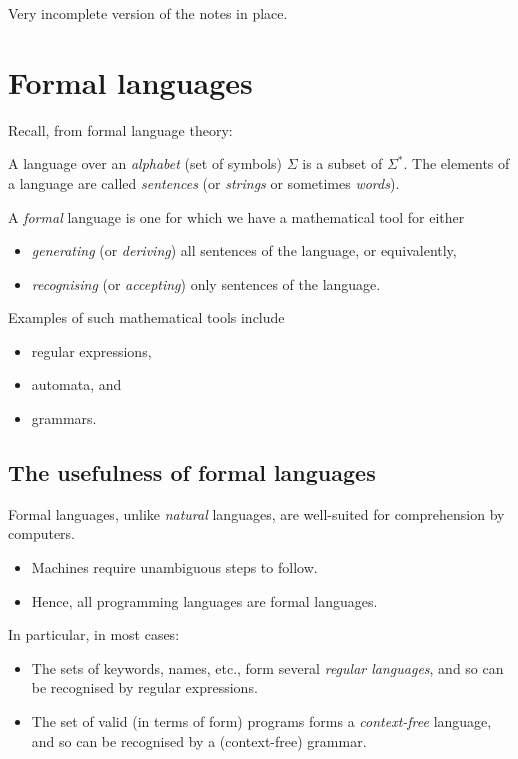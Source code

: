 \documentclass[11pt]{article}
\theoremstyle{definition}
\begin{document}
Very incomplete version of the notes in place.

\section{Formal languages}
\label{sec:orgab38a84}

Recall, from formal language theory:

A language over an \emph{alphabet} (set of symbols) \(Σ\)
is a subset of \(Σ^{*}\).
The elements of a language are called \emph{sentences}
(or \emph{strings} or sometimes \emph{words}).

A \emph{formal} language is one for which we have a mathematical tool
for either
\begin{itemize}
\item \emph{generating} (or \emph{deriving}) all sentences of the language,
or equivalently,
\item \emph{recognising} (or \emph{accepting}) only sentences of the language.
\end{itemize}

Examples of such mathematical tools include
\begin{itemize}
\item regular expressions,
\item automata, and
\item grammars.
\end{itemize}

\subsection{The usefulness of formal languages}
\label{sec:org0d49544}

Formal languages, unlike \emph{natural} languages, are well-suited
for comprehension by computers.
\begin{itemize}
\item Machines require unambiguous steps to follow.
\item Hence, all programming languages are formal languages.
\end{itemize}

In particular, in most cases:
\begin{itemize}
\item The sets of keywords, names, etc., form several \emph{regular languages},
and so can be recognised by regular expressions.
\item The set of valid (in terms of form) programs forms
a \emph{context-free} language, and so can be recognised by
a (context-free) grammar.
\end{itemize}
\end{document}
